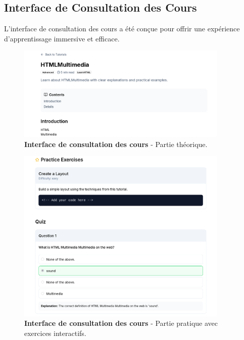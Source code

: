 \subsection{Interface de Consultation des Cours}

L'interface de consultation des cours a été conçue pour offrir une expérience d'apprentissage immersive et efficace.

\begin{figure}[h!]
  \centering
  \includegraphics[width=0.9\textwidth,keepaspectratio]{week_3_img/part1.png}
  \caption{\textbf{Interface de consultation des cours} - Partie théorique.}
  \label{fig:course_view_part1}
\end{figure}

\begin{figure}[h!]
  \centering
  \includegraphics[width=0.9\textwidth,keepaspectratio]{week_3_img/part2.png}
  \caption{\textbf{Interface de consultation des cours} - Partie pratique avec exercices interactifs.}
  \label{fig:course_view_part2}
\end{figure}

